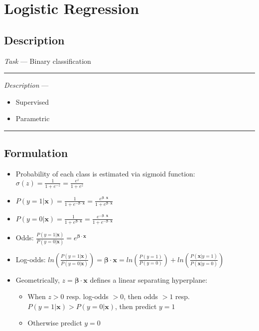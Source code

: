 \section{Logistic Regression}
\subsection*{Description}
\emph{Task} --- Binary classification

{\color{lightgray}\hrule height 0.001mm}

\emph{Description} --- 
\begin{itemize}
    \item Supervised
    \item Parametric
\end{itemize}

{\color{black}\hrule height 0.001mm}

\subsection*{Formulation}

\begin{itemize}
    \item Probability of each class is estimated via sigmoid function: $\sigma(z) = \frac{1}{1+e^{-z}} = \frac{e^{z}}{1+e^{z}}$
    \item $P(y=1|\boldsymbol{x}) = \frac{1}{1+e^{-\boldsymbol{\beta} \cdot \boldsymbol{x}}} = \frac{e^{\boldsymbol{\beta} \cdot \boldsymbol{x}}}{1+e^{\boldsymbol{\beta} \cdot \boldsymbol{x}}}$
    \item $P(y=0|\boldsymbol{x}) = \frac{1}{1+e^{\boldsymbol{\beta} \cdot \boldsymbol{x}}} = \frac{e^{-\boldsymbol{\beta} \cdot \boldsymbol{x}}}{1+e^{-\boldsymbol{\beta} \cdot \boldsymbol{x}}}$
    \item Odds: $\frac{P(y=1|\boldsymbol{x})}{P(y=0|\boldsymbol{x})} = e^{\boldsymbol{\beta} \cdot \boldsymbol{x}}$
    \item Log-odds: $ln(\frac{P(y=1|\boldsymbol{x})}{P(y=0|\boldsymbol{x})}) = \boldsymbol{\beta} \cdot \boldsymbol{x} = ln(\frac{P(y=1)}{P(y=0)}) + ln(\frac{P(\boldsymbol{x}|y=1)}{P(\boldsymbol{x}|y=0)})$
    \item Geometrically, $z = \boldsymbol{\beta} \cdot \boldsymbol{x}$ defines a linear separating hyperplane:
    \begin{itemize}
        \item When $z > 0$ resp. log-odds $> 0$, then odds $> 1$ resp. $P(y=1|\boldsymbol{x}) > P(y=0|\boldsymbol{x})$, then predict $y = 1$
        \item Otherwise predict $y = 0$
    \end{itemize}
\end{itemize}

